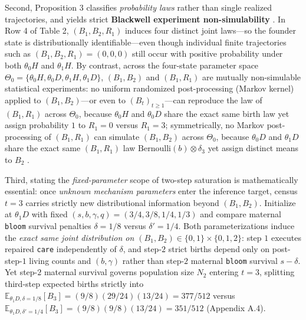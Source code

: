 \documentclass[11pt,a4paper]{article}
\begin{document}
Second, Proposition 3 classifies \emph{probability laws} rather than
single realized trajectories, and yields strict \textbf{Blackwell
experiment non-simulability}
\citep{blackwell1953, barnettCrutchfield2015}. In Row 4 of Table 2,
\((B_1, B_2, R_1)\) induces four distinct joint laws---so the founder
state is distributionally identifiable---even though individual finite
trajectories such as \((B_1, B_2, R_1) = (0, 0, 0)\) still occur with
positive probability under both \(\theta_0 H\) and \(\theta_1 H\). By
contrast, across the four-state parameter space
\(\Theta_0 = \{\theta_0 H, \theta_0 D, \theta_1 H, \theta_1 D\}\),
\((B_1, B_2)\) and \((B_1, R_1)\) are mutually non-simulable statistical
experiments: no uniform randomized post-processing (Markov kernel)
applied to \((B_1, B_2)\)---or even to \((B_t)_{t \ge 1}\)---can
reproduce the law of \((B_1, R_1)\) across \(\Theta_0\), because
\(\theta_0 H\) and \(\theta_0 D\) share the exact same birth law yet
assign probability \(1\) to \(R_1 = 0\) versus \(R_1 = 3\);
symmetrically, no Markov post-processing of \((B_1, R_1)\) can simulate
\((B_1, B_2)\) across \(\Theta_0\), because \(\theta_0 D\) and
\(\theta_1 D\) share the exact same \((B_1, R_1)\) law
\(\mathrm{Bernoulli}(b) \otimes \delta_3\) yet assign distinct means to
\(B_2\) \citep{wimsatt2007, craver2007}.

Third, stating the \emph{fixed-parameter} scope of two-step saturation
is mathematically essential: once \emph{unknown mechanism parameters}
enter the inference target, census \(t = 3\) carries strictly new
distributional information beyond \((B_1, B_2)\). Initialize at
\(\theta_1 D\) with fixed \((s, b, \gamma, q) = (3/4, 3/8, 1/4, 1/3)\)
and compare maternal \texttt{bloom} survival penalties \(\delta = 1/8\)
versus \(\delta' = 1/4\). Both parameterizations induce the \emph{exact
same joint distribution on \((B_1, B_2) \in \{0,1\} \times \{0,1,2\}\)}:
step \(1\) executes repaired \texttt{care} independently of \(\delta\),
and step-\(2\) strict births depend only on post-step-\(1\) living
counts and \((b, \gamma)\) rather than step-\(2\) maternal
\texttt{bloom} survival \(s - \delta\). Yet step-\(2\) maternal survival
governs population size \(N_2\) entering \(t = 3\), splitting third-step
expected births strictly into
\(\mathbb{E}_{\theta_1 D,\delta=1/8}[B_3] = (9/8)(29/24)(13/24) = 377/512\)
versus
\(\mathbb{E}_{\theta_1 D,\delta'=1/4}[B_3] = (9/8)(9/8)(13/24) = 351/512\)
(Appendix A.4).
\end{document}
